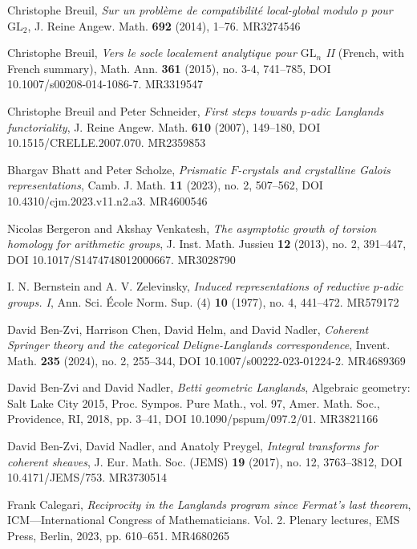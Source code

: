 \item[{[Bre14]}] Christophe Breuil, \emph{Sur un probl\`eme de compatibilit\'e local-global modulo $p$ pour $\mathrm{GL}_2$}, J. Reine Angew. Math. \textbf{692} (2014), 1--76. MR3274546
\item[{[Bre15]}] Christophe Breuil, \emph{Vers le socle localement analytique pour $\mathrm{GL}_n$ II} (French, with French summary), Math. Ann. \textbf{361} (2015), no. 3-4, 741--785, DOI 10.1007/s00208-014-1086-7. MR3319547
\item[{[BS07]}] Christophe Breuil and Peter Schneider, \emph{First steps towards $p$-adic Langlands functoriality}, J. Reine Angew. Math. \textbf{610} (2007), 149--180, DOI 10.1515/CRELLE.2007.070. MR2359853
\item[{[BS23]}] Bhargav Bhatt and Peter Scholze, \emph{Prismatic $F$-crystals and crystalline Galois representations}, Camb. J. Math. \textbf{11} (2023), no. 2, 507--562, DOI 10.4310/cjm.2023.v11.n2.a3. MR4600546
\item[{[BV13]}] Nicolas Bergeron and Akshay Venkatesh, \emph{The asymptotic growth of torsion homology for arithmetic groups}, J. Inst. Math. Jussieu \textbf{12} (2013), no. 2, 391--447, DOI 10.1017/S1474748012000667. MR3028790
\item[{[BZ77]}] I. N. Bernstein and A. V. Zelevinsky, \emph{Induced representations of reductive $p$-adic groups. I}, Ann. Sci. \'Ecole Norm. Sup. (4) \textbf{10} (1977), no. 4, 441--472. MR579172
\item[{[BZCHN24]}] David Ben-Zvi, Harrison Chen, David Helm, and David Nadler, \emph{Coherent Springer theory and the categorical Deligne-Langlands correspondence}, Invent. Math. \textbf{235} (2024), no. 2, 255--344, DOI 10.1007/s00222-023-01224-2. MR4689369
\item[{[BZN18]}] David Ben-Zvi and David Nadler, \emph{Betti geometric Langlands}, Algebraic geometry: Salt Lake City 2015, Proc. Sympos. Pure Math., vol. 97, Amer. Math. Soc., Providence, RI, 2018, pp. 3--41, DOI 10.1090/pspum/097.2/01. MR3821166
\item[{[BZNP17]}] David Ben-Zvi, David Nadler, and Anatoly Preygel, \emph{Integral transforms for coherent sheaves}, J. Eur. Math. Soc. (JEMS) \textbf{19} (2017), no. 12, 3763--3812, DOI 10.4171/JEMS/753. MR3730514
\item[{[Cal23]}] Frank Calegari, \emph{Reciprocity in the Langlands program since Fermat's last theorem}, ICM---International Congress of Mathematicians. Vol. 2. Plenary lectures, EMS Press, Berlin, 2023, pp. 610--651. MR4680265
